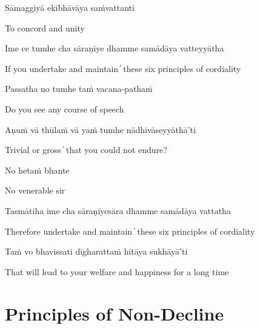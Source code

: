Sāmaggiyā ekībhāvāya saṁvattanti

\begin{cprenglish}
To concord and unity
\end{cprenglish}


Ime ce tumhe cha sāraṇīye dhamme samādāya vatteyyātha

\begin{cprenglish}
If you undertake and maintain  ̓  these six principles of cordiality
\end{cprenglish}

Passatha no tumhe taṁ vacana-pathaṁ

\begin{cprenglish}
Do you see any course of speech
\end{cprenglish}

Aṇuṁ vā thūlaṁ vā yaṁ tumhe nādhivāseyyāthā’ti

\begin{cprenglish}
Trivial or gross  ̓  that you could not endure?
\end{cprenglish}

No hetaṁ bhante

\begin{cprenglish}
No venerable sir
\end{cprenglish}

Tasmātiha ime cha sāraṇīyesāra dhamme samādāya vattatha

\begin{cprenglish}
Therefore undertake and maintain  ̓  these six principles of cordiality
\end{cprenglish}

Taṁ vo bhavissati dīgharattaṁ hitāya sukhāyā’ti

\begin{cprenglish}
That will lead to your welfare and happiness for a long time
\end{cprenglish}


\clearpage

\section*{Principles of Non-Decline}

\begin{leader}
\end{leader}

